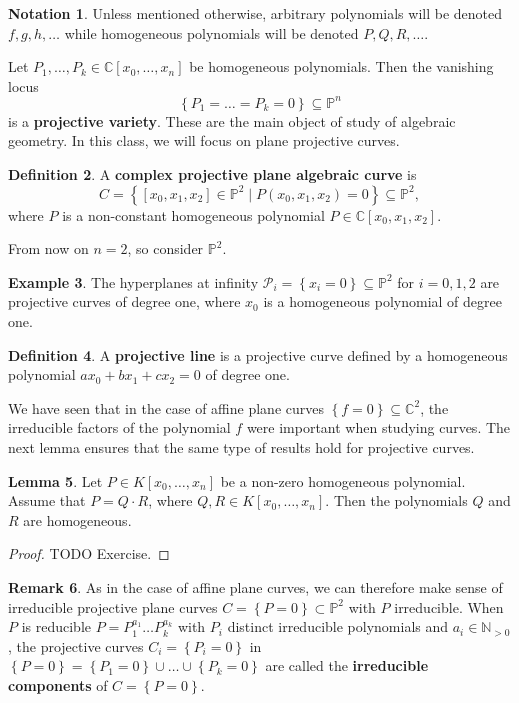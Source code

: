 \documentclass{article}
\newcommand{\N}{\mathbb{N}}
\newcommand{\C}{\mathbb{C}}
\renewcommand{\P}{\mathbb{P}}
\newcommand{\rb}[1]{\left( #1 \right)}
\renewcommand{\sb}[1]{\left[ #1 \right]}
\newcommand{\cb}[1]{\left\{ #1 \right\}}
\theoremstyle{definition}\newtheorem{definition}{Definition}[section]
\theoremstyle{definition}\newtheorem{notation}[definition]{Notation}
\theoremstyle{definition}\newtheorem{remark}[definition]{Remark}
\theoremstyle{definition}\newtheorem{example}[definition]{Example}
\theoremstyle{definition}\newtheorem{fact}{Fact}
\theoremstyle{definition}\newtheorem{exercise}{Exercise}
\newtheorem{lemma}[definition]{Lemma}
\begin{document}
\begin{notation}
Unless mentioned otherwise, arbitrary polynomials will be denoted $ f, g, h, \dots $ while homogeneous polynomials will be denoted $ P, Q, R, \dots $.
\end{notation}

Let $ P_1, \dots, P_k \in \C\sb{x_0, \dots, x_n} $ be homogeneous polynomials. Then the vanishing locus
$$ \cb{P_1 = \dots = P_k = 0} \subseteq \P^n $$
is a \textbf{projective variety}. These are the main object of study of algebraic geometry. In this class, we will focus on plane projective curves.

\begin{definition}
A \textbf{complex projective plane algebraic curve} is
$$ C = \cb{\sb{x_0, x_1, x_2} \in \P^2 \mid P\rb{x_0, x_1, x_2} = 0} \subseteq \P^2, $$
where $ P $ is a non-constant homogeneous polynomial $ P \in \C\sb{x_0, x_1, x_2} $.
\end{definition}

From now on $ n = 2 $, so consider $ \P^2 $.

\begin{example}
The hyperplanes at infinity $ \mathcal{P}_i = \cb{x_i = 0} \subseteq \P^2 $ for $ i = 0, 1, 2 $ are projective curves of degree one, where $ x_0 $ is a homogeneous polynomial of degree one.
\end{example}

\begin{definition}
A \textbf{projective line} is a projective curve defined by a homogeneous polynomial $ ax_0 + bx_1 + cx_2 = 0 $ of degree one.
\end{definition}

We have seen that in the case of affine plane curves $ \cb{f = 0} \subseteq \C^2 $, the irreducible factors of the polynomial $ f $ were important when studying curves. The next lemma ensures that the same type of results hold for projective curves.

\begin{lemma}
\label{lem:4.10}
Let $ P \in K\sb{x_0, \dots, x_n} $ be a non-zero homogeneous polynomial. Assume that $ P = Q \cdot R $, where $ Q, R \in K\sb{x_0, \dots, x_n} $. Then the polynomials $ Q $ and $ R $ are homogeneous.
\end{lemma}

\begin{proof}
TODO Exercise.
\end{proof}

\begin{remark}
As in the case of affine plane curves, we can therefore make sense of irreducible projective plane curves $ C = \cb{P = 0} \subset \P^2 $ with $ P $ irreducible. When $ P $ is reducible $ P = P_1^{a_1} \dots P_k^{a_k} $ with $ P_i $ distinct irreducible polynomials and $ a_i \in \N_{> 0} $, the projective curves $ C_i = \cb{P_i = 0} $ in $ \cb{P = 0} = \cb{P_1 = 0} \cup \dots \cup \cb{P_k = 0} $ are called the \textbf{irreducible components} of $ C = \cb{P = 0} $.
\end{remark}
\end{document}
